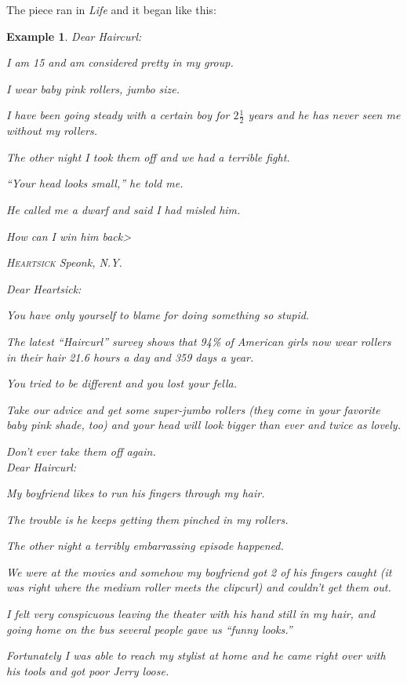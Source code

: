 \documentclass{book}
\numberwithin{equation}{section}
\newtheorem{example}{Example}[chapter]
\begin{document}
The piece ran in \textit{Life} and it began like this:
\begin{example}
    Dear Haircurl:
    
    I am 15 and am considered pretty in my group.
    
    I wear baby pink rollers, jumbo size.
    
    I have been going steady with a certain boy for $2\frac{1}{2}$ years and he has never seen me without my rollers.
    
    The other night I took them off and we had a terrible fight.
    
    ``Your head looks small,'' he told me.
    
    He called me a dwarf and said I had misled him.
    
    How can I win him back>
    \begin{flushright}
        \textsc{Heartsick}
        Speonk, N.Y.
    \end{flushright}
    Dear Heartsick:
    
    You have only yourself to blame for doing something so stupid.
    
    The latest ``Haircurl'' survey shows that 94\% of American girls now wear rollers in their hair 21.6 hours a day and 359 days a year.
    
    You tried to be different and you lost your fella.
    
    Take our advice and get some super-jumbo rollers (they come in your favorite baby pink shade, too) and your head will look bigger than ever and twice as lovely.
    
    Don't ever take them off again.
    \\
    \noindent
    Dear Haircurl:
    
    My boyfriend likes to run his fingers through my hair.
    
    The trouble is he keeps getting them pinched in my rollers.
    
    The other night a terribly embarrassing episode happened.
    
    We were at the movies and somehow my boyfriend got 2 of his fingers caught (it was right where the medium roller meets the clipcurl) and couldn't get them out.
    
    I felt very conspicuous leaving the theater with his hand still in my hair, and going home on the bus several people gave us ``funny looks.''
    
    Fortunately I was able to reach my stylist at home and he came right over with his tools and got poor Jerry loose.
    

\end{example}
\end{document}
